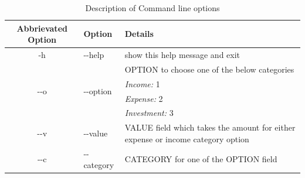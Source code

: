 \documentclass[a4paper,11pt]{book}
\begin{document}
\begin{table}[ht]
\caption{Description of Command line options}
\centering
\fontsize{10pt}{12pt}\selectfont
\begin{tabular}{c|l|| p{8cm}}
    \hline
	\hline
    \textbf{Abbrievated Option} & \textbf{Option} & \textbf{Details} \\ 
    \hline
    \hline    
    
    -h & \--\--help & show this help message and exit \\ \hline
    \hline
    
    \multirow{4}{*}{\--\--o}&\multirow{4}{*}{\--\--option}&OPTION to choose one of the below categories\\
    &&\emph{Income: } 1\\
    &&\emph{Expense: } 2\\
    &&\emph{Investment: } 3\\
    \hline
    \hline    

    \--\--v & \--\--value  &  VALUE field which takes the amount for either expense or income category option \\ 
    \hline
    \hline
    
    \multirow{36}{*}{\--\--c} & \multirow{36}{*}{\--\--category} &  CATEGORY for one of the OPTION field\\
    

\end{tabular}
\end{table}
\end{document}
